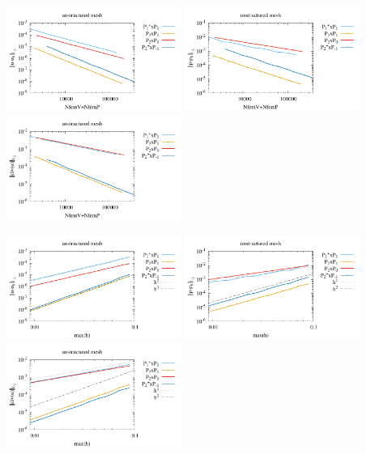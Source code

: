 \begin{center}
\includegraphics[width=5.7cm]{python_codes/fieldstone_120/paperresults/dh_unstructured_errorsV2.pdf}
\includegraphics[width=5.7cm]{python_codes/fieldstone_120/paperresults/dh_unstructured_errorsP2.pdf}
\includegraphics[width=5.7cm]{python_codes/fieldstone_120/paperresults/dh_unstructured_errors_divv2.pdf}\\
\end{center}

\begin{center}
\includegraphics[width=5.7cm]{python_codes/fieldstone_120/paperresults/dh_unstructured_errorsV3.pdf}
\includegraphics[width=5.7cm]{python_codes/fieldstone_120/paperresults/dh_unstructured_errorsP3.pdf}
\includegraphics[width=5.7cm]{python_codes/fieldstone_120/paperresults/dh_unstructured_errors_divv3.pdf}\\
\end{center}






